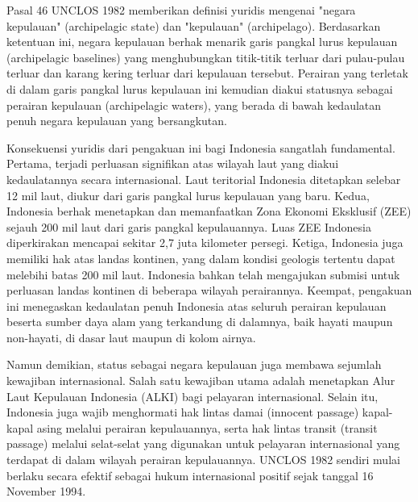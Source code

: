 \documentclass[12pt, a4paper]{article}
\begin{document}
Pasal 46 UNCLOS 1982 memberikan definisi yuridis mengenai "negara kepulauan" (archipelagic state) dan "kepulauan" (archipelago). Berdasarkan ketentuan ini, negara kepulauan berhak menarik garis pangkal lurus kepulauan (archipelagic baselines) yang menghubungkan titik-titik terluar dari pulau-pulau terluar dan karang kering terluar dari kepulauan tersebut. Perairan yang terletak di dalam garis pangkal lurus kepulauan ini kemudian diakui statusnya sebagai perairan kepulauan (archipelagic waters), yang berada di bawah kedaulatan penuh negara kepulauan yang bersangkutan.  

Konsekuensi yuridis dari pengakuan ini bagi Indonesia sangatlah fundamental. Pertama, terjadi perluasan signifikan atas wilayah laut yang diakui kedaulatannya secara internasional. Laut teritorial Indonesia ditetapkan selebar 12 mil laut, diukur dari garis pangkal lurus kepulauan yang baru. Kedua, Indonesia berhak menetapkan dan memanfaatkan Zona Ekonomi Eksklusif (ZEE) sejauh 200 mil laut dari garis pangkal kepulauannya. Luas ZEE Indonesia diperkirakan mencapai sekitar 2,7 juta kilometer persegi. Ketiga, Indonesia juga memiliki hak atas landas kontinen, yang dalam kondisi geologis tertentu dapat melebihi batas 200 mil laut. Indonesia bahkan telah mengajukan submisi untuk perluasan landas kontinen di beberapa wilayah perairannya. Keempat, pengakuan ini menegaskan kedaulatan penuh Indonesia atas seluruh perairan kepulauan beserta sumber daya alam yang terkandung di dalamnya, baik hayati maupun non-hayati, di dasar laut maupun di kolom airnya.  

Namun demikian, status sebagai negara kepulauan juga membawa sejumlah kewajiban internasional. Salah satu kewajiban utama adalah menetapkan Alur Laut Kepulauan Indonesia (ALKI) bagi pelayaran internasional. Selain itu, Indonesia juga wajib menghormati hak lintas damai (innocent passage) kapal-kapal asing melalui perairan kepulauannya, serta hak lintas transit (transit passage) melalui selat-selat yang digunakan untuk pelayaran internasional yang terdapat di dalam wilayah perairan kepulauannya. UNCLOS 1982 sendiri mulai berlaku secara efektif sebagai hukum internasional positif sejak tanggal 16 November 1994.  
\end{document}

